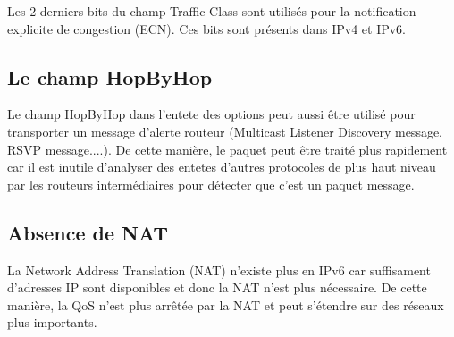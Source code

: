     Les 2 derniers bits du champ Traffic Class sont utilisés pour la notification explicite de congestion (ECN). Ces bits sont présents dans IPv4 et IPv6.

\subsection{Le champ HopByHop}
    Le champ HopByHop dans l'entete des options peut aussi être utilisé pour transporter un message d'alerte routeur (Multicast Listener Discovery message, RSVP message....). De cette manière, le paquet peut être traité plus rapidement car il est inutile d'analyser des entetes d'autres protocoles de plus haut niveau par les routeurs intermédiaires pour détecter que c'est un paquet message.
    
\subsection{Absence de NAT}
	La Network Address Translation (NAT) n'existe plus en IPv6 car suffisament d'adresses IP sont disponibles et donc la NAT n'est plus nécessaire. De cette manière, la QoS n'est plus arrêtée par la NAT et peut s'étendre sur des réseaux plus importants.